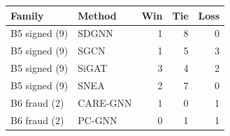 \begin{tabular}{llrrr}
\toprule
Family & Method & Win & Tie & Loss \\
\midrule
B5 signed (9) & SDGNN & 1 & 8 & 0 \\
B5 signed (9) & SGCN & 1 & 5 & 3 \\
B5 signed (9) & SiGAT & 3 & 4 & 2 \\
B5 signed (9) & SNEA & 2 & 7 & 0 \\
B6 fraud (2) & CARE-GNN & 1 & 0 & 1 \\
B6 fraud (2) & PC-GNN & 0 & 1 & 1 \\
\bottomrule
\end{tabular}
